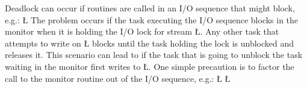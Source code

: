 \documentclass[openright,twoside]{report}
\begin{document}
 Deadlock can occur if routines are called in an I/O sequence that might block, e.g.:
\LGinlinefalse\LGbegin\lgrinde
\L{}
\endlgrinde\LGend
The problem occurs if the task executing the I/O sequence blocks in the monitor when it is holding the I/O lock for stream \LGinlinetrue\LGbegin\lgrinde\L{}\endlgrinde\LGend{}.
Any other task that attempts to write on \LGinlinetrue\LGbegin\lgrinde\L{}\endlgrinde\LGend{} blocks until the task holding the lock is unblocked and releases it.
This scenario can lead to  if the task that is going to unblock the task waiting in the monitor first writes to \LGinlinetrue\LGbegin\lgrinde\L{}\endlgrinde\LGend{}.
One simple precaution is to factor the call to the monitor routine out of the I/O sequence, e.g.:
\LGinlinefalse\LGbegin\lgrinde
\L{}
\L{}
\endlgrinde\LGend
\end{document}
